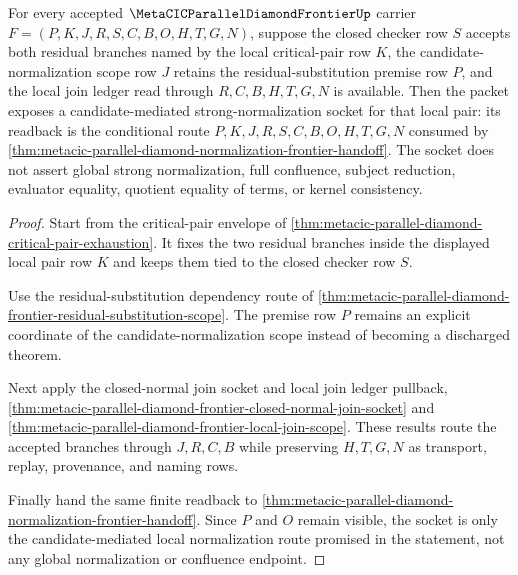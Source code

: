 \begin{theorem}
\label{thm:metacic-parallel-diamond-frontier-candidate-mediated-sn-socket}
For every accepted $\MetaCICParallelDiamondFrontierUp$ carrier $F=(P,K,J,R,S,C,B,O,H,T,G,N)$, suppose the closed checker row $S$ accepts both residual branches named by the local critical-pair row $K$, the candidate-normalization scope row $J$ retains the residual-substitution premise row $P$, and the local join ledger read through $R,C,B,H,T,G,N$ is available. Then the packet exposes a candidate-mediated strong-normalization socket for that local pair: its readback is the conditional route $P,K,J,R,S,C,B,O,H,T,G,N$ consumed by \autoref{thm:metacic-parallel-diamond-normalization-frontier-handoff}. The socket does not assert global strong normalization, full confluence, subject reduction, evaluator equality, quotient equality of terms, or kernel consistency.
\end{theorem}
\begin{proof}
Start from the critical-pair envelope of \autoref{thm:metacic-parallel-diamond-critical-pair-exhaustion}. It fixes the two residual branches inside the displayed local pair row $K$ and keeps them tied to the closed checker row $S$.

Use the residual-substitution dependency route of \autoref{thm:metacic-parallel-diamond-frontier-residual-substitution-scope}. The premise row $P$ remains an explicit coordinate of the candidate-normalization scope instead of becoming a discharged theorem.

Next apply the closed-normal join socket and local join ledger pullback, \autoref{thm:metacic-parallel-diamond-frontier-closed-normal-join-socket} and \autoref{thm:metacic-parallel-diamond-frontier-local-join-scope}. These results route the accepted branches through $J,R,C,B$ while preserving $H,T,G,N$ as transport, replay, provenance, and naming rows.

Finally hand the same finite readback to \autoref{thm:metacic-parallel-diamond-normalization-frontier-handoff}. Since $P$ and $O$ remain visible, the socket is only the candidate-mediated local normalization route promised in the statement, not any global normalization or confluence endpoint.
\end{proof}

